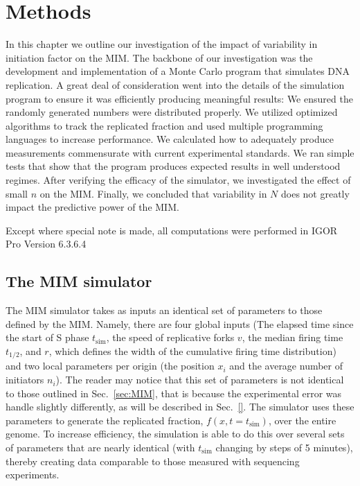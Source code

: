 \chapter{Methods}
\label{ch:Methods}

In this chapter we outline our investigation of the impact of variability in initiation factor on the MIM.
The backbone of our investigation was the development and implementation of a Monte Carlo program that simulates DNA replication.
A great deal of consideration went into the details of the simulation program to ensure it was efficiently producing meaningful results:
We ensured the randomly generated numbers were distributed properly.
We utilized optimized algorithms to track the replicated fraction and used multiple programming languages to increase performance.
We calculated how to adequately produce measurements commensurate with current experimental standards.
We ran simple tests that show that the program produces expected results in well understood regimes.
After verifying the efficacy of the simulator, we investigated the effect of small $n$ on the MIM.
Finally, we concluded that variability in $N$ does not greatly impact the predictive power of the MIM.

Except where special note is made, all computations were performed in IGOR Pro Version 6.3.6.4


	\section{The MIM simulator}
	\label{sec:MIMSimulator}
	
	The MIM simulator takes as inputs an identical set of parameters to those defined by the MIM.
	Namely, there are four global inputs (The elapsed time since the start of S phase $t_\text{sim}$, the speed of replicative forks $v$, the median firing time $t_{1/2}$, and $r$, which defines the width of the cumulative firing time distribution) and two local parameters per origin (the position $x_i$ and the average number of initiators $n_i$).
	The reader may notice that this set of parameters is not identical to those outlined in Sec.~\ref{sec:MIM}, that is because the experimental error was handle slightly differently, as will be described in Sec.~\ref{}.
	The simulator uses these parameters to generate the replicated fraction, $f(x,t=t_\text{sim})$, over the entire genome.
	To increase efficiency, the simulation is able to do this over several sets of parameters that are nearly identical (with $t_\text{sim}$ changing by steps of 5 minutes), thereby creating data comparable to those measured with sequencing experiments.
	
